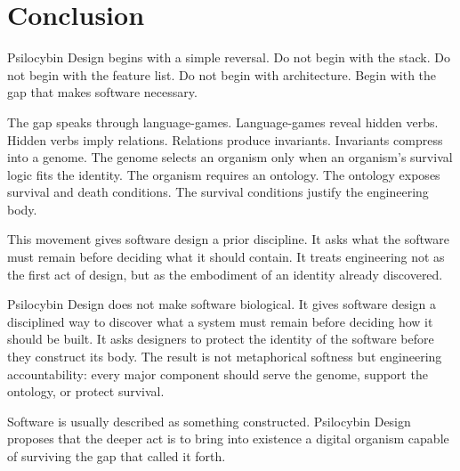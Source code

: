 \documentclass[11pt]{article}
\begin{document}
\section{Conclusion}

Psilocybin Design begins with a simple reversal. Do not begin with the stack. Do not begin with the feature list. Do not begin with architecture. Begin with the gap that makes software necessary.

The gap speaks through language-games. Language-games reveal hidden verbs. Hidden verbs imply relations. Relations produce invariants. Invariants compress into a genome. The genome selects an organism only when an organism's survival logic fits the identity. The organism requires an ontology. The ontology exposes survival and death conditions. The survival conditions justify the engineering body.

This movement gives software design a prior discipline. It asks what the software must remain before deciding what it should contain. It treats engineering not as the first act of design, but as the embodiment of an identity already discovered.

Psilocybin Design does not make software biological. It gives software design a disciplined way to discover what a system must remain before deciding how it should be built. It asks designers to protect the identity of the software before they construct its body. The result is not metaphorical softness but engineering accountability: every major component should serve the genome, support the ontology, or protect survival.

Software is usually described as something constructed. Psilocybin Design proposes that the deeper act is to bring into existence a digital organism capable of surviving the gap that called it forth.
\end{document}
